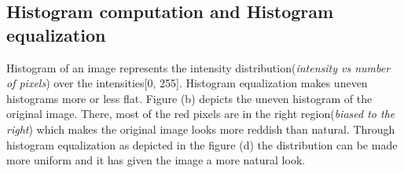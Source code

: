 \documentclass[a4paper,10pt]{article}%
\begin{document}
\subsection{Histogram computation and Histogram equalization}
Histogram of an image represents the intensity distribution(\textit{intensity vs number of pixels}) over the intensities[0, 255]. Histogram equalization makes uneven histograms more or less flat. Figure (b) depicts the uneven histogram  of the original image. There, most of the red pixels are in the right region(\textit{biased to the right}) which makes the original image looks more reddish than natural. Through histogram equalization as depicted in the figure (d) the distribution can be made more uniform and it has given the image a more natural look.
\begin{figure}[!h]
	\centering
\end{figure}
\end{document}
